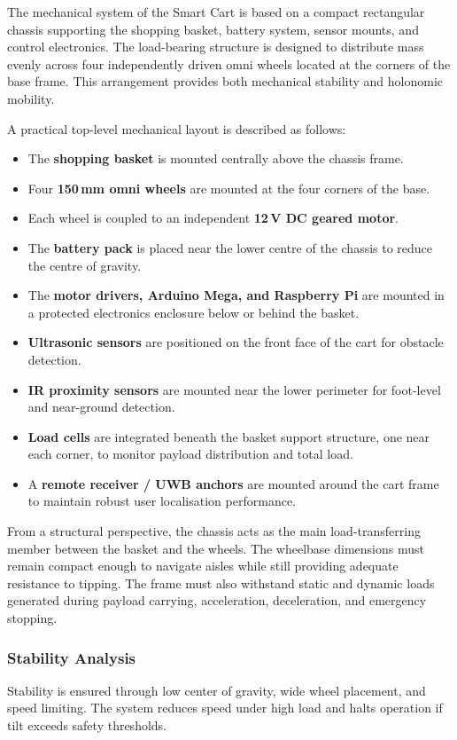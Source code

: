 The mechanical system of the Smart Cart is based on a compact rectangular
chassis supporting the shopping basket, battery system, sensor mounts,
and control electronics. The load-bearing structure is designed to
distribute mass evenly across four independently driven omni wheels
located at the corners of the base frame. This arrangement provides both
mechanical stability and holonomic mobility.

A practical top-level mechanical layout is described as follows:
\begin{itemize}
  \item The \textbf{shopping basket} is mounted centrally above the chassis frame.
  \item Four \textbf{150\,mm omni wheels} are mounted at the four corners of the base.
  \item Each wheel is coupled to an independent \textbf{12\,V DC geared motor}.
  \item The \textbf{battery pack} is placed near the lower centre of the chassis to reduce the centre of gravity.
  \item The \textbf{motor drivers, Arduino Mega, and Raspberry Pi} are mounted in a protected electronics enclosure below or behind the basket.
  \item \textbf{Ultrasonic sensors} are positioned on the front face of the cart for obstacle detection.
  \item \textbf{IR proximity sensors} are mounted near the lower perimeter for foot-level and near-ground detection.
  \item \textbf{Load cells} are integrated beneath the basket support structure, one near each corner, to monitor payload distribution and total load.
  \item A \textbf{remote receiver / UWB anchors} are mounted around the cart frame to maintain robust user localisation performance.
\end{itemize}

From a structural perspective, the chassis acts as the main
load-transferring member between the basket and the wheels. The wheelbase
dimensions must remain compact enough to navigate aisles while still
providing adequate resistance to tipping. The frame must also withstand
static and dynamic loads generated during payload carrying, acceleration,
deceleration, and emergency stopping.

\subsubsection{Stability Analysis}
Stability is ensured through low center of gravity, wide wheel placement, and speed limiting. The system reduces speed under high load and halts operation if tilt exceeds safety thresholds.

